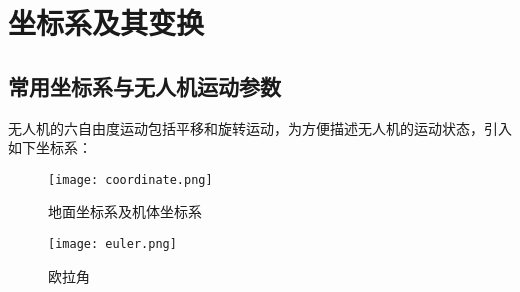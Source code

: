 \section{坐标系及其变换}
\subsection{常用坐标系与无人机运动参数}
\label{sec:1}
无人机的六自由度运动包括平移和旋转运动，为方便描述无人机的运动状态，引入如下坐标系：
\begin{figure}[htbp]
    \centering
    \begin{minipage}{.49\linewidth}
        \centering
        \texttt{[image: coordinate.png]}
        \caption{地面坐标系及机体坐标系}
        \label{fig:coordinate}
    \end{minipage}
    \hfill
    \begin{minipage}{.49\linewidth}
        \centering
        \texttt{[image: euler.png]}
        \caption{欧拉角}
        \label{fig:euler}
    \end{minipage}
\end{figure}

